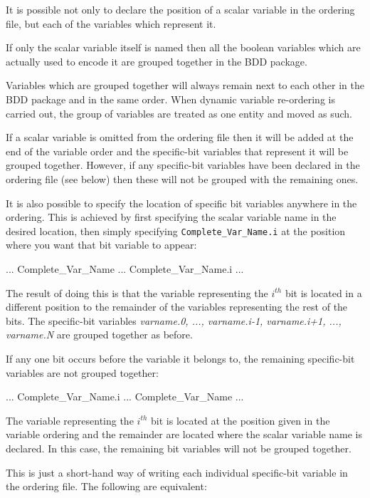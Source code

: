 It is possible not only to declare the position of a scalar variable
in the ordering file, but each of the \Boolean variables which
represent it.

\noindent If only the scalar variable itself is named then all the
boolean variables which are actually used to encode it are grouped
together in the BDD package.

\noindent Variables which are grouped together will always remain next
to each other in the BDD package and in the same order.
%
When dynamic variable re-ordering is carried out, the group of
variables are treated as one entity and moved as such.

\noindent If a scalar variable is omitted from the ordering file then
it will be added at the end of the variable order and the specific-bit
variables that represent it will be grouped together.
%
However, if any specific-bit variables have been declared in the
ordering file (see below) then these will not be grouped with the
remaining ones.

\noindent It is also possible to specify the location of specific bit variables
anywhere in the ordering.
%
This is achieved by first specifying the scalar variable name in the
desired location, then simply specifying
\texttt{Complete\_Var\_Name.i} at the position where you want that bit
variable to appear:
%
\begin{Grammar}
...
Complete\_Var\_Name
...
Complete\_Var\_Name.i
...
\end{Grammar}
%
The result of doing this is that the variable representing the
\textit{$i^{th}$} bit is located in a different position to the
remainder of the variables representing the rest of the bits.
%
The specific-bit variables \textit{varname.0, ..., varname.i-1,
varname.i+1, ..., varname.N} are grouped together as before.

If any one bit occurs before the variable it belongs to, the remaining
specific-bit variables are not grouped together:
%
\begin{Grammar}
...
Complete\_Var\_Name.i
...
Complete\_Var\_Name
...
\end{Grammar}
%
The variable representing the \textit{$i^{th}$} bit is located at the
position given in the variable ordering and the remainder are located
where the scalar variable name is declared. In this case, the
remaining bit variables will not be grouped together.

\noindent This is just a short-hand way of writing each individual
specific-bit variable in the ordering file. The following are
equivalent:

